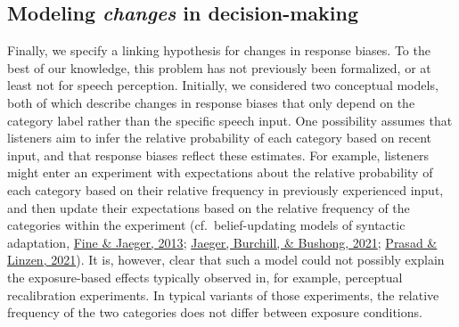\documentclass[
  11pt,
  english,
  man,floatsintext]{apa6}
\begin{document}
\hypertarget{sec:change-bias}{%
\subsection{\texorpdfstring{Modeling \emph{changes} in decision-making}{Modeling changes in decision-making}}\label{sec:change-bias}}

Finally, we specify a linking hypothesis for changes in response biases. To the best of our knowledge, this problem has not previously been formalized, or at least not for speech perception. Initially, we considered two conceptual models, both of which describe changes in response biases that only depend on the category label rather than the specific speech input. One possibility assumes that listeners aim to infer the relative probability of each category based on recent input, and that response biases reflect these estimates. For example, listeners might enter an experiment with expectations about the relative probability of each category based on their relative frequency in previously experienced input, and then update their expectations based on the relative frequency of the categories within the experiment (cf.~belief-updating models of syntactic adaptation, \protect\hyperlink{ref-fine-jaeger2013}{Fine \& Jaeger, 2013}; \protect\hyperlink{ref-jaeger2019}{Jaeger, Burchill, \& Bushong, 2021}; \protect\hyperlink{ref-prasad2021}{Prasad \& Linzen, 2021}). It is, however, clear that such a model could not possibly explain the exposure-based effects typically observed in, for example, perceptual recalibration experiments. In typical variants of those experiments, the relative frequency of the two categories does not differ between exposure conditions.
\end{document}
